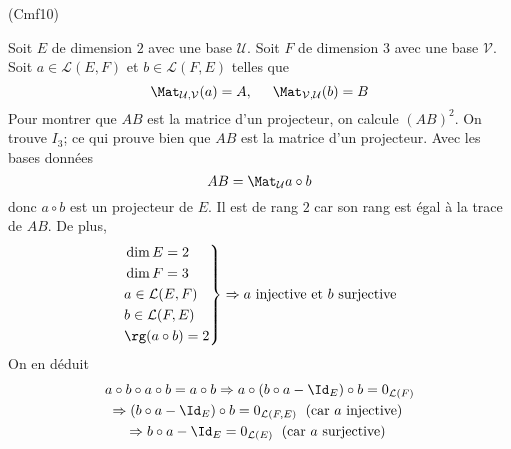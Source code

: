 \begin{tiny}(Cmf10)\end{tiny} Soit $E$ de dimension $2$ avec une base $\mathcal{U}$. Soit $F$ de dimension $3$ avec une base $\mathcal{V}$. Soit $a\in \mathcal{L}(E,F)$ et $b\in \mathcal{L}(F,E)$ telles que
\begin{displaymath}
  \Mat_{\mathcal{U},\mathcal{V}}(a) = A,\hspace{0.5cm}   \Mat_{\mathcal{V},\mathcal{U}}(b) = B 
\end{displaymath}
Pour montrer que $AB$ est la matrice d'un projecteur, on calcule $(AB)^2$. On trouve $I_3$; ce qui prouve bien que $AB$ est la matrice d'un projecteur. Avec les bases données
\begin{displaymath}
  AB =\Mat_{\mathcal{U}}a\circ b
\end{displaymath}
donc $a\circ b$ est un projecteur de $E$. Il est de rang $2$ car son rang est égal à la trace de $AB$. De plus,
\begin{displaymath}
\left. 
\begin{aligned}
  &\dim E = 2 \\ &\dim F = 3 \\ &a\in \mathcal{L}(E,F) \\ &b\in \mathcal{L}(F,E) \\ &\rg(a\circ b) = 2
\end{aligned}
\right\rbrace 
\Rightarrow a\text{ injective et } b \text{ surjective}
\end{displaymath}
On en déduit
\begin{multline*}
a\circ b \circ a \circ b = a\circ b \Rightarrow a\circ \left( b\circ a - \Id_E \right)\circ b = 0_{\mathcal{L}(F)} \\
\Rightarrow \left( b\circ a - \Id_E \right)\circ b = 0_{\mathcal{L}(F,E)}\; \text{ (car $a$ injective) } \\
\Rightarrow b\circ a - \Id_E = 0_{\mathcal{L}(E)}\; \text{ (car $a$ surjective) } 
\end{multline*}
